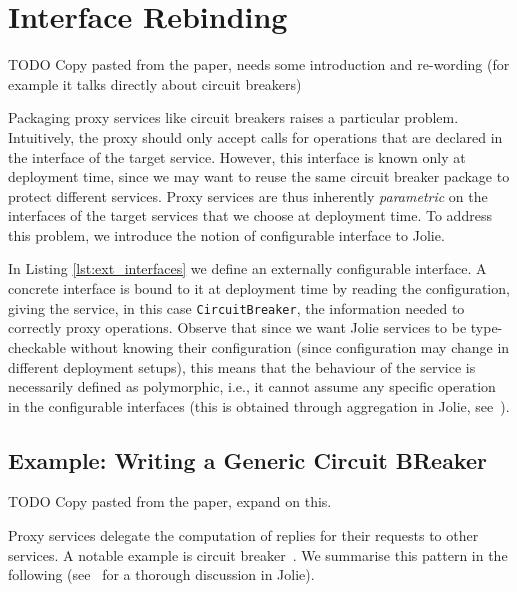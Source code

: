 \section{Interface Rebinding}
\label{sec:interface_rebinding}

TODO Copy pasted from the paper, needs some introduction and re-wording (for
example it talks directly about circuit breakers)

Packaging proxy services like circuit breakers raises a particular problem.
Intuitively, the proxy should only accept calls for operations that are
declared in the interface of the target service. However, this interface is
known only at deployment time, since we may want to reuse the same circuit
breaker package to protect different services.
Proxy services are thus inherently \emph{parametric} on the interfaces of the
target services that we choose at deployment time. To address this problem, we
introduce the notion of configurable interface to Jolie.


In Listing \ref{lst:ext_interfaces} we define an externally configurable
interface. A concrete interface is bound to it at deployment time by reading
the configuration, giving the service, in this case \lstinline|CircuitBreaker|,
the information needed to correctly proxy operations. Observe that since we
want Jolie services to be type-checkable without knowing their configuration
(since configuration may change in different deployment setups), this means
that the behaviour of the service is necessarily defined as polymorphic, i.e.,
it cannot assume any specific operation in the configurable interfaces (this is
obtained through aggregation in Jolie, see~\cite{MGZ14}).

\subsection{Example: Writing a Generic Circuit BReaker}

TODO Copy pasted from the paper, expand on this.


Proxy services delegate the computation of replies for their requests to other
services. A notable example is circuit breaker~\cite{N07}.
%
We summarise this pattern in the following
(see~\cite{DBLP:journals/corr/MontesiW16} for a thorough discussion in Jolie).

